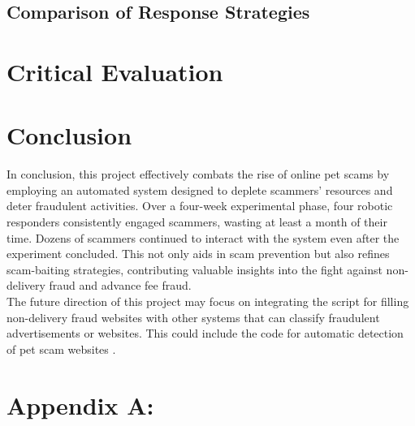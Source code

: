 \documentclass[ oneside,%
                    author={Cassie Qing Tang},
                    degree={BSc},
                     title={An Automated Response System for Disrupting Online Pet Scamming \\ },
                    subtitle={ }]{dissertation}
\begin{document}
\section{Comparison of Response Strategies}






\chapter{Critical Evaluation}









\chapter{Conclusion}
In conclusion, this project effectively combats the rise of online pet scams by employing an automated system designed to deplete scammers' resources and deter fraudulent activities. Over a four-week experimental phase, four robotic responders consistently engaged scammers, wasting at least a month of their time. Dozens of scammers continued to interact with the system even after the experiment concluded. This not only aids in scam prevention but also refines scam-baiting strategies, contributing valuable insights into the fight against non-delivery fraud and advance fee fraud.
\\

The future direction of this project may focus on integrating the script for filling non-delivery fraud websites with other systems that can classify fraudulent advertisements or websites. This could include the code for automatic detection of pet scam websites \cite{mehmedov_automated_2021}.



% 


\appendix

\chapter{Appendix A: }
\label{}
\end{document}
